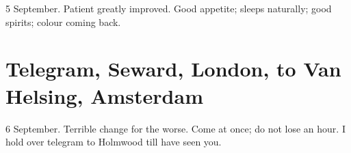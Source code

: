 \begin{telegram}{5 September.}
Patient greatly improved. Good appetite; sleeps naturally; good spirits; colour coming back.
\end{telegram}

\section{Telegram, Seward, London, to Van Helsing, Amsterdam}

\begin{telegram}{6 September.}
Terrible change for the worse. Come at once; do not lose an hour. I hold over telegram to Holmwood till have seen you.
\end{telegram}
